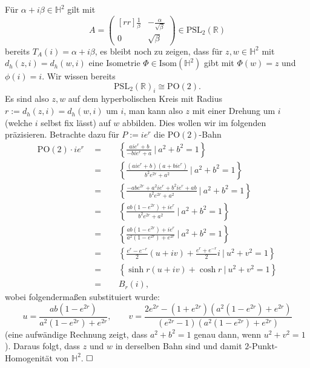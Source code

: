 \documentclass[11pt]{book}
\numberwithin{dummy}{section}
\theoremstyle{nonumberbreak}
\newenvironment{prob}[1][]{\ifthenelse{\equal{#1}{}}{\problem}{\problem[#1]}\rm}{\endproblem}
\newenvironment{sol}[1][]{\ifthenelse{\equal{#1}{}}{\solution}{\solution[#1]}\rm}{\endsolution}
\newcommand{\R}{\mathbb{R}}
\newcommand{\He}{\mathbb{H}}
\begin{document}
\begin{spacing}{1.4}
\begin{prob}
\begin{sol}
\begin{compactenum}
\item Für $\alpha + i \beta \in \He^2$ gilt mit 
$$A=\begin{pmatrix}[rr] \frac{1}{\beta} & -\frac{\alpha}{\sqrt{\beta}} \\ 0 & \sqrt{\beta} \end{pmatrix} \in \mathrm{PSL}_2(\R)$$ 
bereits $T_A(i)=\alpha + i\beta$, es bleibt noch zu zeigen, dass für $z,w\in \He^2$ mit $d_h(z,i)=d_h(w,i)$ eine Isometrie $\Phi \in \mathrm{Isom}(\He^2)$ gibt mit $\Phi(w)=z$ und $\phi(i)=i$. Wir wissen bereits
$$\mathrm{PSL}_2(\R)_i\cong \mathrm{PO}(2).$$
Es sind also $z,w$ auf dem hyperbolischen Kreis mit Radius $r:=d_h(z,i)=d_h(w,i)$ um $i$, man kann also $z$ mit einer Drehung um $i$ (welche $i$ selbst fix lässt) auf $w$ abbilden. Dies wollen wir im folgenden präzisieren. Betrachte dazu für $P:=ie^{r}$ die $\mathrm{PO}(2)$-Bahn
\begin{alignat*}{5}
\mathrm{PO}(2) \cdot ie^r \ \ &=&& \ \ \left\{ \frac{aie^r + b}{-bie^r + a} \ \bigg\vert \ a^2+b^2=1 \right\}\\
&=&& \ \ \left\{ \frac{(aie^r + b)(a+bie^r)}{b^2e^{2r}+a^2} \ \bigg\vert \ a^2+b^2 =1 \right\} \\
&=&& \ \ \left\{ \frac{-	ab e^{2r} + a^2ie^r + b^2ie^r  + ab}{b^2e^{2r}+a^2} \ \bigg\vert \ a^2+b^2=1\right\}\\
&=&& \ \ \left\{\frac{ab(1-e^{2r}) + ie^r}{b^2e^{2r}+a^2} \ \bigg\vert \ a^2+b^2=1\right\} \\
&=&& \ \ \left\{\frac{ab(1-e^{2r}) + ie^{r}}{a^2(1-e^{2r}) + e^{2r}} \ \bigg\vert \ a^2+b^2 = 1 \right\} \\
&=&& \ \ \left\{ \frac{e^r-e^{-r}}{2}(u+iv) + \frac{e^r+e^{-r}}{2} i \ \bigg \vert \ u^2 +v^2 =1 \right\}\\
&=&& \ \ \left\{ \sinh r (u+iv) + \cosh r \ \bigg\vert \ u^2+v^2=1 \right\}\\
&=&& \ \ B_r(i),
\end{alignat*}
wobei folgendermaßen substituiert wurde:
$$u=\frac{ab(1-e^{2r})}{a^2(1-e^{2r})+e^{2r}}, \qquad v=\frac{2e^{2r}-(1+e^{2r})(a^2(1-e^{2r})+e^{2r})}{(e^{2r}-1)(a^2(1-e^{2r})+e^{2r})}$$
(eine aufwändige Rechnung zeigt, dass $a^2+b^2=1$ genau dann, wenn $u^2+v^2=1$).
Daraus folgt, dass $z$ und $w$ in derselben Bahn sind und damit $2$-Punkt-Homogenität von $\He^2$. $\hfill \Box$


\end{compactenum}

\end{sol}



\end{prob}
\end{spacing}
\end{document}
